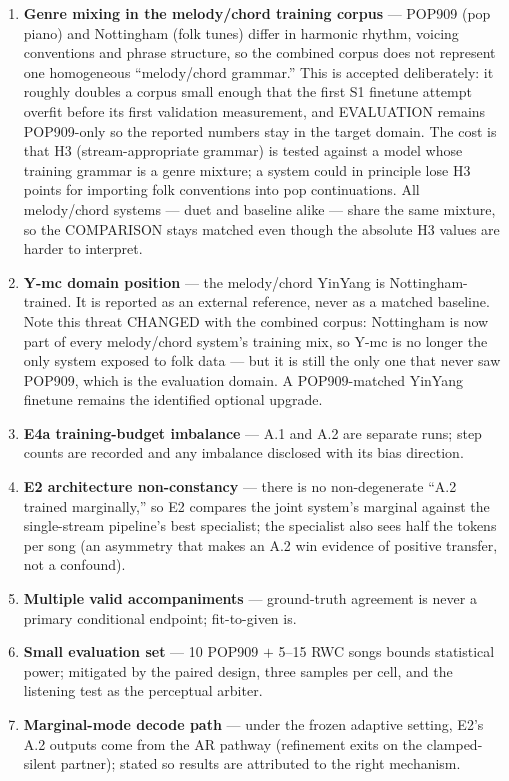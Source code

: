\documentclass[11pt]{article}
\begin{document}
\begin{enumerate}[nosep]
  \item \textbf{Genre mixing in the melody/chord training corpus} ---
    POP909 (pop piano) and Nottingham (folk tunes) differ in harmonic
    rhythm, voicing conventions and phrase structure, so the combined
    corpus does not represent one homogeneous ``melody/chord grammar.''
    This is accepted deliberately: it roughly doubles a corpus small
    enough that the first S1 finetune attempt overfit before its first
    validation measurement, and EVALUATION remains POP909-only so the
    reported numbers stay in the target domain. The cost is that H3
    (stream-appropriate grammar) is tested against a model whose
    training grammar is a genre mixture; a system could in principle
    lose H3 points for importing folk conventions into pop
    continuations. All melody/chord systems --- duet and baseline
    alike --- share the same mixture, so the COMPARISON stays matched
    even though the absolute H3 values are harder to interpret.
  \item \textbf{Y-mc domain position} --- the melody/chord YinYang is
    Nottingham-trained. It is reported as an external reference, never
    as a matched baseline. Note this threat CHANGED with the combined
    corpus: Nottingham is now part of every melody/chord system's
    training mix, so Y-mc is no longer the only system exposed to folk
    data --- but it is still the only one that never saw POP909, which
    is the evaluation domain. A POP909-matched YinYang finetune remains
    the identified optional upgrade.
  \item \textbf{E4a training-budget imbalance} --- A.1 and A.2 are
    separate runs; step counts are recorded and any imbalance
    disclosed with its bias direction.
  \item \textbf{E2 architecture non-constancy} --- there is no
    non-degenerate ``A.2 trained marginally,'' so E2 compares the
    joint system's marginal against the single-stream pipeline's best
    specialist; the specialist also sees half the tokens per song (an
    asymmetry that makes an A.2 win evidence of positive transfer,
    not a confound).
  \item \textbf{Multiple valid accompaniments} --- ground-truth
    agreement is never a primary conditional endpoint; fit-to-given
    is.
  \item \textbf{Small evaluation set} --- 10 POP909 $+$ 5--15 RWC
    songs bounds statistical power; mitigated by the paired design,
    three samples per cell, and the listening test as the perceptual
    arbiter.
  \item \textbf{Marginal-mode decode path} --- under the frozen
    adaptive setting, E2's A.2 outputs come from the AR pathway
    (refinement exits on the clamped-silent partner); stated so
    results are attributed to the right mechanism.
\end{enumerate}
\end{document}
